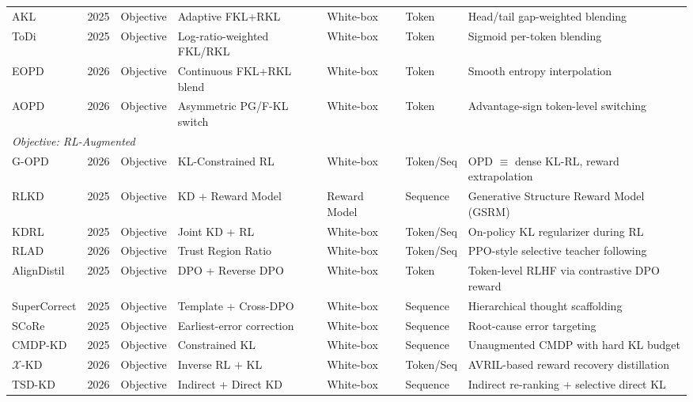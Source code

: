 \documentclass{article} %
\begin{document}
\begin{table}[t]
{\begin{tabular}{@{}lclllll@{}}
        \midrule
        AKL \citep{2404.02657} & 2025 & Objective & Adaptive FKL+RKL & White-box & Token & Head/tail gap-weighted blending \\
        ToDi \citep{2505.16297} & 2025 & Objective & Log-ratio-weighted FKL/RKL & White-box & Token & Sigmoid per-token blending \\
        EOPD \citep{2603.07079} & 2026 & Objective & Continuous FKL+RKL blend & White-box & Token & Smooth entropy interpolation \\
        AOPD \citep{jia2026aopd} & 2026 & Objective & Asymmetric PG/F-KL switch & White-box & Token & Advantage-sign token-level switching \\
        \midrule
        \multicolumn{7}{l}{\textit{Objective: RL-Augmented}} \\
        \midrule
        G-OPD \citep{2602.12125} & 2026 & Objective & KL-Constrained RL & White-box & Token/Seq & OPD $\equiv$ dense KL-RL, reward extrapolation \\
        RLKD \citep{2505.16142} & 2025 & Objective & KD + Reward Model & Reward Model & Sequence & Generative Structure Reward Model (GSRM) \\
        KDRL \citep{2506.02208} & 2025 & Objective & Joint KD + RL & White-box & Token/Seq & On-policy KL regularizer during RL \\
        RLAD \citep{2602.22495} & 2026 & Objective & Trust Region Ratio & White-box & Token/Seq & PPO-style selective teacher following \\
        AlignDistil \citep{2503.02832} & 2025 & Objective & DPO + Reverse DPO & White-box & Token & Token-level RLHF via contrastive DPO reward \\
        SuperCorrect \citep{2410.09008} & 2025 & Objective & Template + Cross-DPO & White-box & Sequence & Hierarchical thought scaffolding \\
        SCoRe \citep{2509.14257} & 2025 & Objective & Earliest-error correction & White-box & Sequence & Root-cause error targeting \\
        CMDP-KD \citep{2509.22921} & 2025 & Objective & Constrained KL & White-box & Sequence & Unaugmented CMDP with hard KL budget \\
        $\mathcal{X}$-KD \citep{2602.12674} & 2026 & Objective & Inverse RL + KL & White-box & Token/Seq & AVRIL-based reward recovery distillation \\
        TSD-KD \citep{2603.13260} & 2026 & Objective & Indirect + Direct KD & White-box & Sequence & Indirect re-ranking + selective direct KL \\

\end{tabular}}
\end{table}
\end{document}
